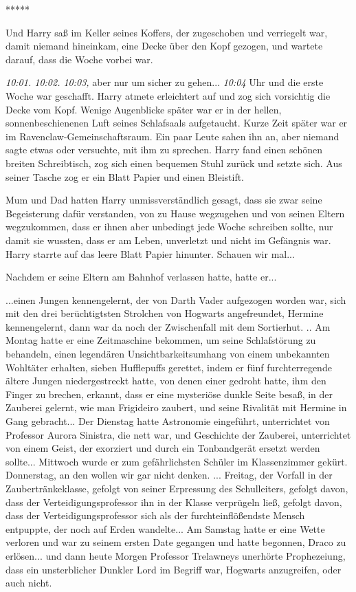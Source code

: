 \begin{center}*****\end{center}

Und Harry saß im Keller seines Koffers, der zugeschoben und verriegelt war,
damit niemand hineinkam, eine Decke über den Kopf gezogen, und wartete darauf,
dass die Woche vorbei war.

\emph{10:01. 10:02. 10:03,} aber nur um sicher zu gehen... \emph{10:04} Uhr und
die erste Woche war geschafft. Harry atmete erleichtert auf und zog sich
vorsichtig die Decke vom Kopf. Wenige Augenblicke später war er in der hellen,
sonnenbeschienenen Luft seines Schlafsaals aufgetaucht. Kurze Zeit später war er
im Ravenclaw-Gemeinschaftsraum. Ein paar Leute sahen ihn an, aber niemand sagte
etwas oder versuchte, mit ihm zu sprechen. Harry fand einen schönen breiten
Schreibtisch, zog sich einen bequemen Stuhl zurück und setzte sich. Aus seiner
Tasche zog er ein Blatt Papier und einen Bleistift.

Mum und Dad hatten Harry unmissverständlich gesagt, dass sie zwar seine
Begeisterung dafür verstanden, von zu Hause wegzugehen und von seinen Eltern
wegzukommen, dass er ihnen aber unbedingt jede Woche schreiben sollte, nur damit
sie wussten, dass er am Leben, unverletzt und nicht im Gefängnis war. Harry
starrte auf das leere Blatt Papier hinunter. Schauen wir mal...

Nachdem er seine Eltern am Bahnhof verlassen hatte, hatte er...

...einen Jungen kennengelernt, der von Darth Vader aufgezogen worden war, sich
mit den drei berüchtigtsten Strolchen von Hogwarts angefreundet, Hermine
kennengelernt, dann war da noch der Zwischenfall mit dem Sortierhut. .. Am
Montag hatte er eine Zeitmaschine bekommen, um seine Schlafstörung zu behandeln,
einen legendären Unsichtbarkeitsumhang von einem unbekannten Wohltäter erhalten,
sieben Hufflepuffs gerettet, indem er fünf furchterregende ältere Jungen
niedergestreckt hatte, von denen einer gedroht hatte, ihm den Finger zu brechen,
erkannt, dass er eine mysteriöse dunkle Seite besaß, in der Zauberei gelernt,
wie man Frigideiro zaubert, und seine Rivalität mit Hermine in Gang gebracht...
Der Dienstag hatte Astronomie eingeführt, unterrichtet von Professor Aurora
Sinistra, die nett war, und Geschichte der Zauberei, unterrichtet von einem
Geist, der exorziert und durch ein Tonbandgerät ersetzt werden sollte...
Mittwoch wurde er zum gefährlichsten Schüler im Klassenzimmer gekürt.
Donnerstag, an den wollen wir gar nicht denken. ... Freitag, der Vorfall in der
Zaubertränkeklasse, gefolgt von seiner Erpressung des Schulleiters, gefolgt
davon, dass der Verteidigungsprofessor ihn in der Klasse verprügeln ließ,
gefolgt davon, dass der Verteidigungsprofessor sich als der furchteinflößendste
Mensch entpuppte, der noch auf Erden wandelte... Am Samstag hatte er eine Wette
verloren und war zu seinem ersten Date gegangen und hatte begonnen, Draco zu
erlösen... und dann heute Morgen Professor Trelawneys unerhörte Prophezeiung,
dass ein unsterblicher Dunkler Lord im Begriff war, Hogwarts anzugreifen, oder
auch nicht.

